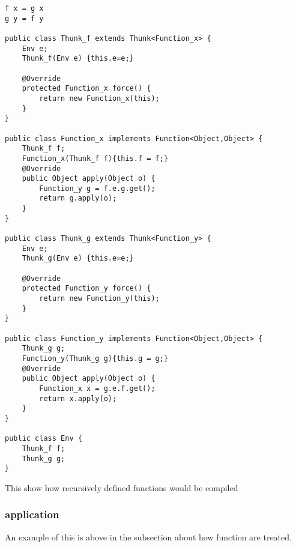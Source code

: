 \documentclass[12pt,a4paper,twoside]{article}
\begin{document}
\begin{verbatim}
f x = g x
g y = f y

public class Thunk_f extends Thunk<Function_x> {
    Env e;
    Thunk_f(Env e) {this.e=e;}

    @Override
    protected Function_x force() {
        return new Function_x(this);
    }
}

public class Function_x implements Function<Object,Object> {
    Thunk_f f;
    Function_x(Thunk_f f){this.f = f;}
    @Override
    public Object apply(Object o) {
        Function_y g = f.e.g.get();
        return g.apply(o);
    }
}

public class Thunk_g extends Thunk<Function_y> {
    Env e;
    Thunk_g(Env e) {this.e=e;}

    @Override
    protected Function_y force() {
        return new Function_y(this);
    }
}

public class Function_y implements Function<Object,Object> {
    Thunk_g g;
    Function_y(Thunk_g g){this.g = g;}
    @Override
    public Object apply(Object o) {
        Function_x x = g.e.f.get();
        return x.apply(o);
    }
}

public class Env {
    Thunk_f f;
    Thunk_g g;
}
\end{verbatim}

This show how recursively defined functions would be compiled

\subsubsection{application}

An example of this is above in the subsection about how function are treated.
\end{document}
